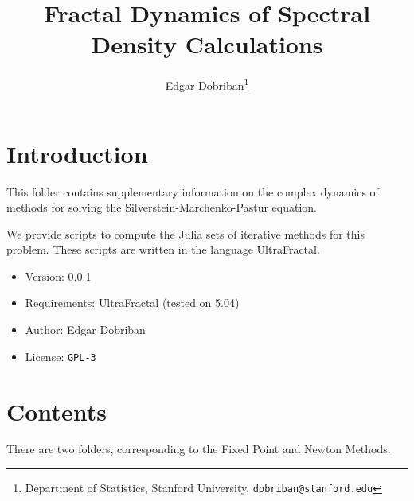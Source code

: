 \documentclass[english,11pt]{article} %
\title{Fractal Dynamics of Spectral Density Calculations}
\author{Edgar Dobriban\thanks{Department of Statistics, Stanford University, \texttt{dobriban@stanford.edu}} }
\begin{document}
\maketitle
\tableofcontents
\section{Introduction}

This folder contains supplementary information on the complex dynamics
of methods for solving the Silverstein-Marchenko-Pastur equation.

We provide scripts to compute the Julia sets of iterative methods for 
this problem. These scripts are written in the language UltraFractal.

\begin{itemize}
\item{Version: } 0.0.1
\item{Requirements: } UltraFractal (tested on 5.04) 
\item{Author: } Edgar Dobriban
\item{License: } \verb+GPL-3+
\end{itemize}

\section{Contents}

There are two folders, corresponding to the Fixed Point and Newton Methods.
\end{document}
